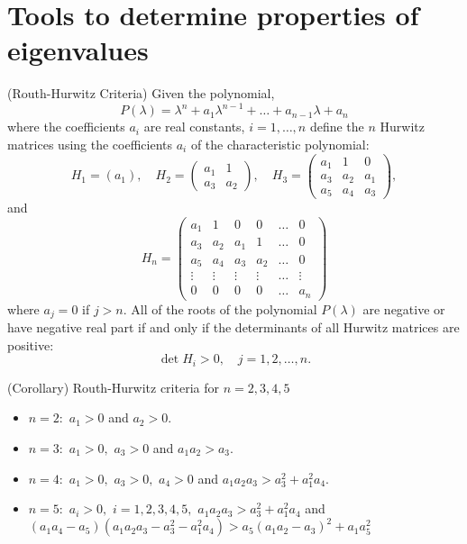 \section{Tools to determine properties of eigenvalues}
\begin{atheorem}(Routh-Hurwitz Criteria)
Given the polynomial,
$$P(\lambda)=\lambda ^n + a_1 \lambda ^{n-1}+\dots + a_{n-1}\lambda +a_n$$
where the coefficients $a_i$ are real constants, $i=1,\dots , n$ define the $n$ Hurwitz matrices using the coefficients $a_i$ of the characteristic polynomial:
$$H_1=(a_1),\quad H_2=\left (\begin{array}{cc}a_1 & 1 \\ a_3 &a_2\end{array}\right), \quad H_3=\left (\begin{array}{ccc}a_1 & 1 & 0 \\ a_3 &a_2 &a_1 \\ a_5& a_4 & a_3\end{array}\right),$$
and
$$H_n=\left (\begin{array}{cccccc}a_1 & 1 & 0 & 0 & \dots &0\\ a_3& a_2 & a_1 & 1 & \dots & 0 \\ a_5 & a_4 & a_3 & a_2 & \dots &0\\\vdots & \vdots & \vdots & \vdots & \dots & \vdots \\ 0 & 0& 0& 0& \dots & a_n\end{array}\right )$$
where $a_j=0$ if $j>n$. All of the roots of the polynomial $P(\lambda)$ are negative or have negative real part if and only if the determinants of all Hurwitz matrices are positive:
$$\det H_i>0, \quad j=1,2,\dots, n.$$
\end{atheorem}



\begin{atheorem}(Corollary)
Routh-Hurwitz criteria for $n=2,3,4,5$
\begin{itemize}
\item $n=2:$ $a_1>0$ and $a_2>0$.
\item $n=3:$ $a_1>0,$ $a_3>0$ and $a_1a_2>a_3$.
\item $n=4:$ $a_1>0,$ $a_3>0,$ $a_4>0$  and $a_1a_2a_3>a_3^2+a_1^2a_4$.
\item $n=5:$ $a_i>0,$ $i=1,2,3,4,5,$ $a_1a_2a_3>a_3^2+a_1^2a_4$ and $(a_1a_4-a_5)(a_1a_2a_3-a_3^2-a_1^2a_4)>a_5(a_1a_2-a_3)^2+a_1a_5^2$
\end{itemize}
\end{atheorem}




